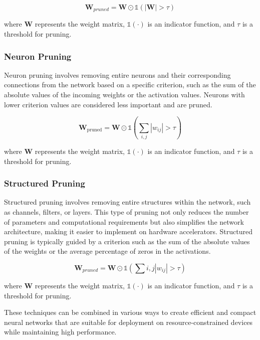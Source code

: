 \documentclass[12pt]{article}
\begin{document}
\begin{equation}
\textbf{W}_{pruned} = \textbf{W} \odot \mathbb{1}(|\textbf{W}| > \tau)
\end{equation}

where $\textbf{W}$ represents the weight matrix, $\mathbb{1}(\cdot)$ is an indicator function, and $\tau$ is a threshold for pruning.

\subsubsection{Neuron Pruning}

Neuron pruning involves removing entire neurons and their corresponding connections from the network based on a specific criterion, such as the sum of the absolute values of the incoming weights or the activation values. Neurons with lower criterion values are considered less important and are pruned.

\begin{equation}
\textbf{W}_{\text{pruned}} = \textbf{W} \odot \mathbb{1}(\sum_{i,j} |w_{ij}| > \tau)
\end{equation}

where $\textbf{W}$ represents the weight matrix, $\mathbb{1}(\cdot)$ is an indicator function, and $\tau$ is a threshold for pruning.

\subsubsection{Structured Pruning}

Structured pruning involves removing entire structures within the network, such as channels, filters, or layers. This type of pruning not only reduces the number of parameters and computational requirements but also simplifies the network architecture, making it easier to implement on hardware accelerators. Structured pruning is typically guided by a criterion such as the sum of the absolute values of the weights or the average percentage of zeros in the activations.

\begin{equation}
\textbf{W}_{pruned} = \textbf{W} \odot \mathbb{1}(\sum{i,j} |w_{ij}| > \tau)
\end{equation}

where $\textbf{W}$ represents the weight matrix, $\mathbb{1}(\cdot)$ is an indicator function, and $\tau$ is a threshold for pruning.

These techniques can be combined in various ways to create efficient and compact neural networks that are suitable for deployment on resource-constrained devices while maintaining high performance.
\end{document}
